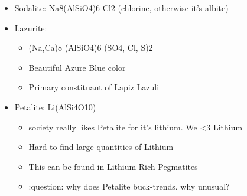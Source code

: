 \documentclass[11pt]{article}
\begin{document}
\begin{itemize}
\begin{itemize}
\item Sodalite: Na8(AlSiO4)6 Cl2 (chlorine, otherwise it's albite)
\item Lazurite:
\begin{itemize}
\item (Na,Ca)8 (AlSiO4)6 (SO4, Cl, S)2
\item Beautiful Azure Blue color
\item Primary constituant of Lapiz Lazuli
\end{itemize}
\item Petalite: Li(AlSi4O10)
\begin{itemize}
\item society really likes Petalite for it's lithium. We <3 Lithium
\item Hard to find large quantities of Lithium
\item This can be found in Lithium-Rich Pegmatites
\item :question: why does Petalite buck-trends. why unusual?
\end{itemize}
\end{itemize}
\end{itemize}
\end{document}
